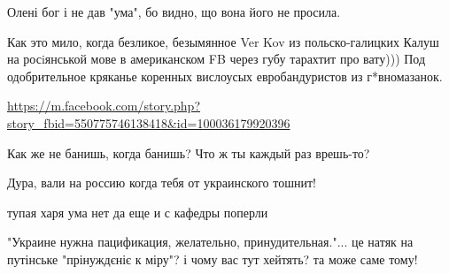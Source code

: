 \begin{itemize}
\begin{itemize}
Олені бог і не дав "ума", бо видно, що вона його не просила.

\end{itemize}

 

Как это мило, когда безликое, безымянное Ver Kov из польско-галицких Калуш на
росiянськой мове в американском FB через губу тарахтит про вату))) Под
одобрительное кряканье коренных вислоусых евробандуристов из г*вномазанок.


 
\url{https://m.facebook.com/story.php?story_fbid=550775746138418&id=100036179920396}

 
Как же не банишь, когда банишь? Что ж ты каждый раз врешь-то?

 
Дура, вали на россию когда тебя от украинского тошнит!

 
тупая харя ума нет да еще и с кафедры поперли

 

"Украине нужна пацификация, желательно, принудительная."... це натяк на
путінське "прінуждєніє к міру"? і чому вас тут хейтять? та може саме тому!
\end{itemize}

